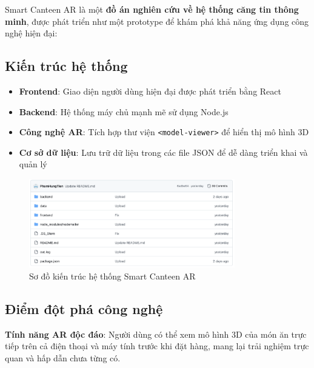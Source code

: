 \documentclass[12pt,a4paper]{article}
\begin{document}
Smart Canteen AR là một \textbf{đồ án nghiên cứu về hệ thống căng tin thông minh}, được phát triển như một prototype để khám phá khả năng ứng dụng công nghệ hiện đại:

\subsection{Kiến trúc hệ thống}
\begin{itemize}[leftmargin=1cm]
    \item \textbf{Frontend}: Giao diện người dùng hiện đại được phát triển bằng React
    \item \textbf{Backend}: Hệ thống máy chủ mạnh mẽ sử dụng Node.js
    \item \textbf{Công nghệ AR}: Tích hợp thư viện \texttt{<model-viewer>} để hiển thị mô hình 3D
    \item \textbf{Cơ sở dữ liệu}: Lưu trữ dữ liệu trong các file JSON để dễ dàng triển khai và quản lý
\end{itemize}

\begin{figure}[H]
    \centering
    \includegraphics[width=0.8\textwidth]{images/kien_truc_he_thong.png} %
    \caption{Sơ đồ kiến trúc hệ thống Smart Canteen AR}
    \label{fig:kien_truc_he_thong}
\end{figure}

\subsection{Điểm đột phá công nghệ}
\textbf{Tính năng AR độc đáo}: Người dùng có thể xem mô hình 3D của món ăn trực tiếp trên cả điện thoại và máy tính trước khi đặt hàng, mang lại trải nghiệm trực quan và hấp dẫn chưa từng có.
\end{document}

